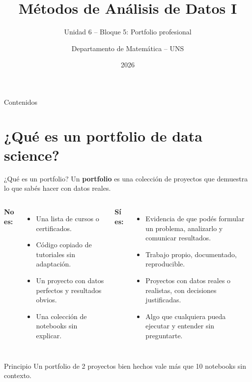 \documentclass[aspectratio=169]{beamer}
\title[MAD1 -- U6]{Métodos de Análisis de Datos I}
\subtitle{Unidad 6 -- Bloque 5: Portfolio profesional}
\author{Departamento de Matemática -- UNS}
\date{2026}
\begin{document}
\begin{frame}
  \titlepage
\end{frame}

\begin{frame}{Contenidos}
  \tableofcontents
\end{frame}

\section{¿Qué es un portfolio de data science?}

\begin{frame}{¿Qué es un portfolio?}
  Un \textbf{portfolio} es una colección de proyectos que demuestra lo que sabés hacer con datos reales.

  \bigskip
  \begin{columns}
      \textbf{No es:}
      \begin{itemize}
        \item Una lista de cursos o certificados.
        \item Código copiado de tutoriales sin adaptación.
        \item Un proyecto con datos perfectos y resultados obvios.
        \item Una colección de notebooks sin explicar.
      \end{itemize}
      \textbf{Sí es:}
      \begin{itemize}
        \item Evidencia de que podés formular un problema, analizarlo y comunicar resultados.
        \item Trabajo propio, documentado, reproducible.
        \item Proyectos con datos reales o realistas, con decisiones justificadas.
        \item Algo que cualquiera pueda ejecutar y entender sin preguntarte.
      \end{itemize}
  \end{columns}

  \bigskip
  \begin{alertblock}{Principio}
    Un portfolio de 2 proyectos bien hechos vale más que 10 notebooks sin contexto.
  \end{alertblock}
\end{frame}

\end{document}
